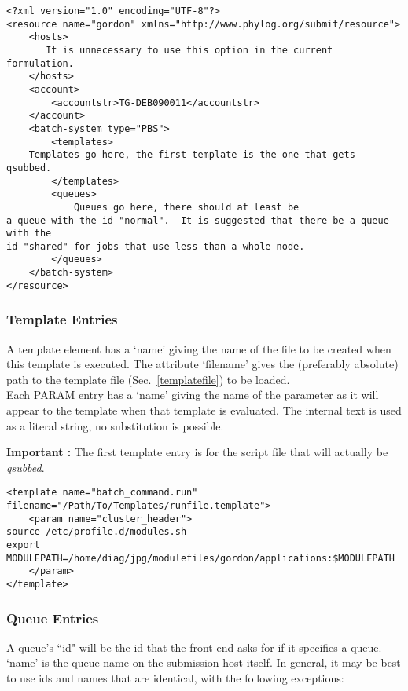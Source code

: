 \lstset{language=XML}
\begin{lstlisting}[caption={General layout of a resource descriptor}]
<?xml version="1.0" encoding="UTF-8"?>
<resource name="gordon" xmlns="http://www.phylog.org/submit/resource">
	<hosts>
	   It is unnecessary to use this option in the current formulation.
	</hosts>
	<account>
		<accountstr>TG-DEB090011</accountstr>
	</account>
	<batch-system type="PBS">
		<templates>
	Templates go here, the first template is the one that gets qsubbed.
		</templates>
		<queues>
			Queues go here, there should at least be
a queue with the id "normal".  It is suggested that there be a queue with the
id "shared" for jobs that use less than a whole node.
		</queues>
	</batch-system>
</resource>
\end{lstlisting}

\subsubsection{Template Entries}
A template element has a `name' giving the name of the file to be created when this template is executed.
The attribute `filename' gives the (preferably absolute) path to the template file (Sec.~\ref{templatefile}) to be loaded.\\
Each PARAM entry has a `name' giving the name of the parameter as it will appear to the template when that template is evaluated. The internal text is used as a literal string, no substitution is possible.

{\bf Important :} The first template entry is for the script file that will actually be {\it qsubbed}.

\begin{lstlisting}[caption={An example template element}]
<template name="batch_command.run" filename="/Path/To/Templates/runfile.template">
	<param name="cluster_header">
source /etc/profile.d/modules.sh
export MODULEPATH=/home/diag/jpg/modulefiles/gordon/applications:$MODULEPATH
	</param>
</template>
\end{lstlisting}

\subsubsection{Queue Entries}
A queue's ``id" will be the id that the front-end asks for if it specifies a queue. `name' is the queue name on the submission host itself.
In general, it may be best to use ids and names that are identical, with the following exceptions:

